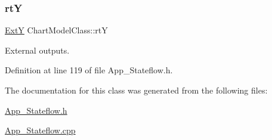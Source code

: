 \mbox{\label{class_chart_model_class_ac7425d26c91af4aaed697e7ac65b46fa}} 
\subsubsection{\texorpdfstring{rtY}{rtY}}
{\footnotesize\ttfamily \mbox{\hyperlink{struct_ext_y}{ExtY}} Chart\+Model\+Class\+::rtY}



External outputs. 



Definition at line 119 of file App\+\_\+\+Stateflow.\+h.



The documentation for this class was generated from the following files\+:\begin{DoxyCompactItemize}
\item 
\mbox{\hyperlink{_app___stateflow_8h}{App\+\_\+\+Stateflow.\+h}}\item 
\mbox{\hyperlink{_app___stateflow_8cpp}{App\+\_\+\+Stateflow.\+cpp}}\end{DoxyCompactItemize}
